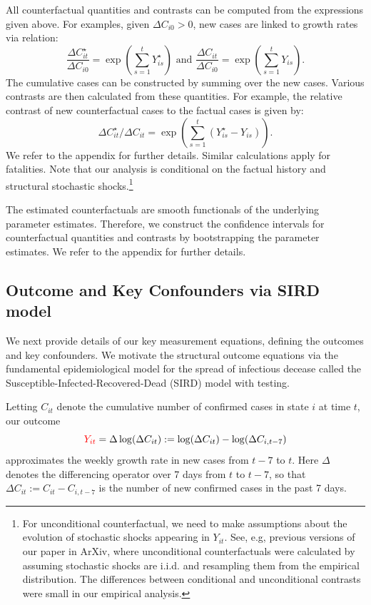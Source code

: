 \documentclass[11pt,reqno,letter]{amsart}
\theoremstyle{definition}
\def\ycolor{\color{red}}
\begin{document}
All counterfactual quantities and contrasts can be computed from the expressions given
above. For examples, given $\Delta C_{i0}>0$, new cases are linked to growth rates via relation:
$$
\frac{\Delta C^{\star}_{it}}{\Delta C_{i0}} = \exp\left (  \sum_{s=1}^t  Y^\star_{is} \right) \text{ and }\frac{ \Delta C_{it}}{\Delta C_{i0}} = \exp
\left (  \sum_{s=1}^t Y_{is}\right).
$$
The cumulative cases can be constructed by summing over the new cases. Various contrasts are
then calculated from these quantities. For example, the relative contrast of new counterfactual cases
to the  factual cases is given by:
$$
\Delta C^{\star}_{it}/\Delta C_{it} = \exp\left(  \sum_{s=1}^t ( Y^\star_{is} -  Y_{is}) \right).
$$
We refer to the appendix for further details. Similar calculations apply for fatalities. 
Note that our analysis is conditional on the factual history and structural stochastic 
shocks.\footnote{For unconditional counterfactual,
we need to make assumptions about the evolution of stochastic shocks appearing in $Y_{it}$. See, e.g, previous
versions of our paper in ArXiv, where unconditional counterfactuals were calculated by assuming stochastic shocks
are i.i.d. and resampling them from the empirical distribution. The differences between conditional and unconditional
contrasts were small in our empirical analysis.}

The estimated counterfactuals are smooth functionals of the underlying parameter estimates. Therefore, we
construct the confidence intervals for counterfactual quantities and contrasts by bootstrapping the parameter
estimates. We refer to the appendix for further details.


\subsection{Outcome and Key Confounders via SIRD model}\label{sec:sirmodel} We next provide details
of our key measurement equations, defining the outcomes and key confounders. We motivate the structural
outcome equations via the fundamental epidemiological model for the spread of infectious decease called
the Susceptible-Infected-Recovered-Dead (SIRD) model with testing.

Letting $C_{it}$ denote the cumulative number of  confirmed cases in state $i$ at time $t$, our outcome
\begin{equation} \label{eq:y}
{\ycolor Y_{it}} =\Delta \log(\Delta C_{it}):= \log( \Delta C_{it} ) -
\log( \Delta C_{i,t-7})
\end{equation}
approximates the weekly growth rate in new cases from $t-7$ to $t$. Here $\Delta$ denotes the differencing operator over 7 days from $t$ to $t-7$, so that $\Delta C_{it}:=C_{it}-C_{i,t-7}$ is the number of new confirmed cases in the past 7 days.
\end{document}
